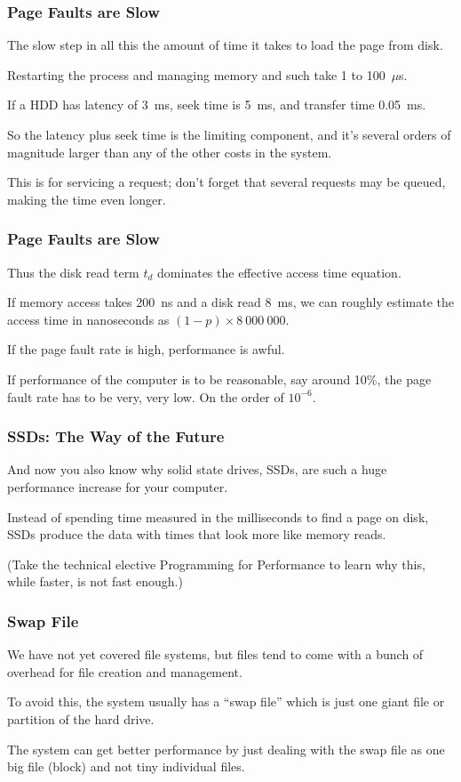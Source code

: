 \begin{frame}
\frametitle{Page Faults are Slow}

The slow step in all this the amount of time it takes to load the page from disk. 

Restarting the process and managing memory and such take 1 to 100~$\mu$s.

If a HDD has latency of 3~ms, seek time is 5~ms, and transfer time 0.05~ms. 

So the latency plus seek time is the limiting component, and it's several orders of magnitude larger than any of the other costs in the system. 

This is for servicing a request; don't forget that several requests may be queued, making the time even longer.

\end{frame}

\begin{frame}
\frametitle{Page Faults are Slow}

Thus the disk read term $t_{d}$ dominates the effective access time equation. 

If memory access takes 200~ns and a disk read 8~ms, we can roughly estimate the access time in nanoseconds as $(1-p) \times 8~000~000$. 

If the page fault rate is high, performance is awful. 

If performance of the computer is to be reasonable, say around 10\%, the page fault rate has to be very, very low. On the order of $10^{-6}$. 

\end{frame}

\begin{frame}
\frametitle{SSDs: The Way of the Future}

And now you also know why solid state drives, SSDs, are such a huge performance increase for your computer. 

Instead of spending time measured in the milliseconds to find a page on disk, SSDs produce the data with times that look more like memory reads.

(Take the technical elective Programming for Performance to learn why this, while faster, is not fast enough.)


\end{frame}

\begin{frame}
\frametitle{Swap File}

We have not yet covered file systems, but files tend to come with a bunch of overhead for file creation and management. 

To avoid this, the system usually has a ``swap file'' which is just one giant file or partition of the hard drive. 

The system can get better performance by just dealing with the swap file as one big file (block) and not tiny individual files.

\end{frame}

